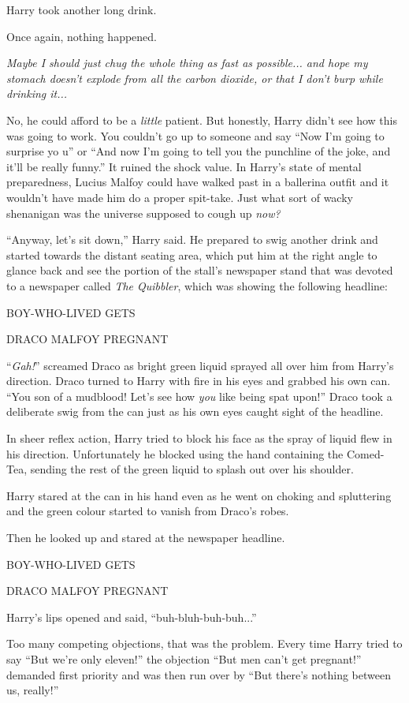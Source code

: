 Harry took another long drink.

Once again, nothing happened.

\emph{Maybe I should just chug the whole thing as fast as possible... and hope my stomach doesn't explode from all the carbon dioxide, or that I don't burp while drinking it...}

No, he could afford to be a \emph{little} patient. But honestly, Harry didn't see how this was going to work. You couldn't go up to someone and say ``Now I'm going to surprise yo u'' or ``And now I'm going to tell you the punchline of the joke, and it'll be really funny.'' It ruined the shock value. In Harry's state of mental preparedness, Lucius Malfoy could have walked past in a ballerina outfit and it wouldn't have made him do a proper spit-take. Just what sort of wacky shenanigan was the universe supposed to cough up \emph{now?}

``Anyway, let's sit down,'' Harry said. He prepared to swig another drink and started towards the distant seating area, which put him at the right angle to glance back and see the portion of the stall's newspaper stand that was devoted to a newspaper called \emph{The Quibbler}, which was showing the following headline:

BOY-WHO-LIVED GETS

DRACO MALFOY PREGNANT

``\emph{Gah!}'' screamed Draco as bright green liquid sprayed all over him from Harry's direction. Draco turned to Harry with fire in his eyes and grabbed his own can. ``You son of a mudblood! Let's see how \emph{you} like being spat upon!'' Draco took a deliberate swig from the can just as his own eyes caught sight of the headline.

In sheer reflex action, Harry tried to block his face as the spray of liquid flew in his direction. Unfortunately he blocked using the hand containing the Comed-Tea, sending the rest of the green liquid to splash out over his shoulder.

Harry stared at the can in his hand even as he went on choking and spluttering and the green colour started to vanish from Draco's robes.

Then he looked up and stared at the newspaper headline.

BOY-WHO-LIVED GETS

DRACO MALFOY PREGNANT

Harry's lips opened and said, ``buh-bluh-buh-buh...''

Too many competing objections, that was the problem. Every time Harry tried to say ``But we're only eleven!'' the objection ``But men can't get pregnant!'' demanded first priority and was then run over by ``But there's nothing between us, really!''

